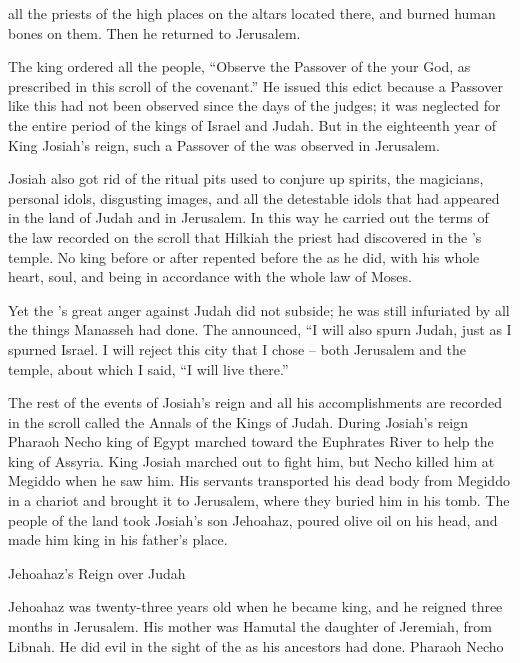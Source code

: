 {all
the priests
of the high places
on
the altars
located
there,
and burned
human
bones
on
them. Then he returned
to Jerusalem.
\par }{\PP {}The king
ordered
all
the people,
“Observe
the Passover
of the {}
your God,
as prescribed
in this
scroll
of the covenant.”
He
issued this edict because
a Passover
like this
had
not
been observed
since the days
of the judges;
it was neglected for the entire
period
of the kings
of Israel
and Judah.
But
in the eighteenth
year
of King
Josiah’s
reign, such a Passover
of the {}
was observed in Jerusalem.
\par }{\PP {}Josiah also
got rid of the ritual pits used to conjure up spirits,
the magicians,
personal idols,
disgusting images,
and all
the detestable idols
that had appeared
in the land
of Judah
and in Jerusalem.
In this way he
carried out
the terms
of the law
recorded
on
the scroll
that
Hilkiah
the priest
had discovered
in the
{}’s
temple.
No
king
before
or
after
repented
before the
{}
as he did, with his whole
heart,
soul,
and being
in accordance
with the whole
law
of Moses.
\par }{\PP {}Yet
the
{}’s
great
anger
against Judah
did not
subside;
he was still infuriated
by all
the things
Manasseh
had done.
The
{}
announced,
“I will also
spurn
Judah,
just
as I spurned
Israel.
I will reject
this
city
that
I chose
– both Jerusalem
and the temple,
about which
I said,
“I will
live
there.”
\par }{\PP {}The rest
of the events
of Josiah’s
reign and all
his accomplishments
are recorded
in the scroll
called the Annals
of the Kings
of Judah.
During
Josiah’s
reign Pharaoh Necho
king
of Egypt
marched
toward the Euphrates
River
to help the king
of Assyria.
King
Josiah
marched out to fight
him, but Necho killed
him at Megiddo
when he saw him.
His servants
transported
his dead
body from Megiddo
in a chariot and brought
it to Jerusalem,
where they buried
him in his tomb.
The people
of the land
took
Josiah’s
son
Jehoahaz,
poured
olive oil on his head, and made
him king
in his father’s
place.
\par }{\SH Jehoahaz’s Reign over Judah
\par }{\PP {}Jehoahaz
was twenty-three
years
old when he became king, and he reigned
three
months
in Jerusalem.
His mother
was Hamutal
the daughter
of Jeremiah,
from Libnah.
He did
evil
in the sight
of the
{}
as
his ancestors
had
done.
Pharaoh Necho
}
